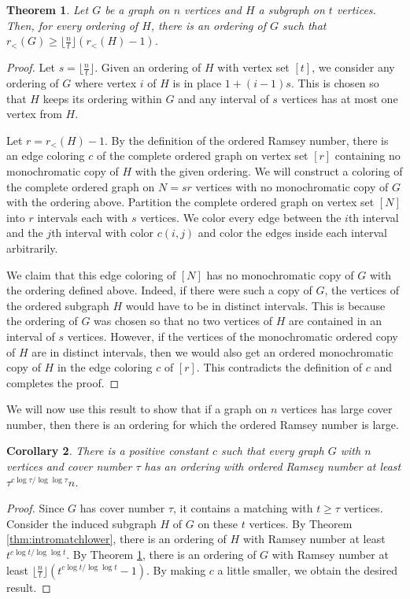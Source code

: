 \documentclass[11pt]{article}
\newtheorem{theorem}{Theorem}[section]
\newtheorem{corollary}[theorem]{Corollary}
\begin{document}
\begin{theorem}\label{GHtheorem}
Let $G$ be a graph on $n$ vertices and $H$ a subgraph on $t$ vertices. Then, for every ordering of $H$, there is an ordering of $G$ such that $r_{<}(G) \geq \lfloor \frac{n}{t} \rfloor(r_{<}(H)-1)$. 
\end{theorem}
\begin{proof}
Let $s=\lfloor \frac{n}{t} \rfloor$. Given an ordering of $H$ with vertex set $[t]$, we consider any ordering of $G$ where vertex $i$ of $H$ is in place $1+(i-1)s$. This is chosen so that $H$ keeps its ordering within $G$ and any interval of $s$ vertices has at most one vertex from $H$.

Let $r = r_<(H) - 1$. By the definition of the ordered Ramsey number, there is an edge coloring $c$ of the complete ordered graph on vertex set $[r]$ containing no monochromatic copy of $H$ with the given ordering. We will construct a coloring of the complete ordered graph on $N=sr$ vertices with no monochromatic copy of $G$ with the ordering above. Partition the complete ordered graph on vertex set $[N]$ into $r$ intervals each with $s$ vertices. We color every edge between the $i$th interval and the $j$th interval with color $c(i,j)$ and color the edges inside each interval arbitrarily. 

We claim that this edge coloring of $[N]$ has no monochromatic copy of $G$ with the ordering defined above. Indeed, if there were such a copy of $G$, the vertices of the ordered subgraph $H$ would have to be in distinct intervals. This is because the ordering of $G$ was chosen so that no two vertices of $H$ are contained in an interval of $s$ vertices. However,  if the vertices of the monochromatic ordered copy of $H$ are in distinct intervals, then we would also get an ordered monochromatic  copy of $H$ in the edge coloring $c$ of $[r]$. This contradicts the definition of $c$ and completes the proof.  
\end{proof}

We will now use this result to show that if a graph on $n$ vertices has large cover number, then there is an ordering for which the ordered Ramsey number is large. 

\begin{corollary}\label{taucor}
There is a positive constant $c$ such that every graph $G$ with $n$ vertices and cover number $\tau$  has an ordering with ordered Ramsey number at least $\tau^{c\log \tau / \log \log \tau}n$. 
\end{corollary}
\begin{proof}
Since $G$ has cover number $\tau$, it contains a matching with $t \geq \tau$ vertices. Consider the induced subgraph $H$ of $G$ on these $t$ vertices. By Theorem \ref{thm:intromatchlower}, there is an ordering of $H$ with Ramsey number at least $t^{c\log t/\log \log t}$. By Theorem \ref{GHtheorem}, there is an ordering of $G$ with Ramsey number at least $\lfloor \frac{n}{t} \rfloor (t^{c\log t/\log \log t} - 1)$. By making $c$ a little smaller, we obtain the desired result.   
\end{proof}
\end{document}
